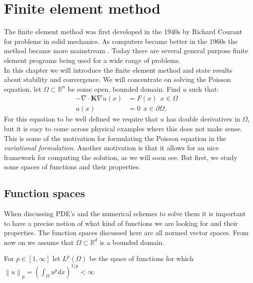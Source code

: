 \documentclass[../Main/main.tex]{subfiles}
\begin{document}
	\graphicspath{{../Finite element method/figs/}}
	\chapter{Finite element method}
	The finite element method was first developed in the 1940s by Richard Courant for problems in solid mechanics. As computers became better in the 1960s the method became  more mainstream \cite{Stein2014}. Today there are several general purpose finite element programs being used for a wide range of problems.\\
	In this chapter we will introduce the finite element method and state results about stability and convergence.
	We will concentrate on solving the Poisson equation, let $\Omega \subset \mathbb{R}^n$ be some open, bounded domain. Find $u$ such that:
	\begin{equation} \label{eq:poisson}
		\begin{split}
			-\nabla \cdot \pmb{K} \nabla u(x) &= F(x) \ \  x\in \Omega \\ 
			u(x) &= 0 \ \ x\in \partial \Omega.
		\end{split}
	\end{equation}
	For this equation to be well defined we require that $u$ has double derivatives in $\Omega$, but it is easy to come across physical examples where this does not make sense.
	This is some of the motivation for formulating the Poisson equation in the \emph{variational formulation}. Another motivation is that it allows for an nice framework for computing the solution, as we will soon see. But first, we study some spaces of functions and their properties.
	
	
	\section*{Function spaces}
	When discussing PDE's and the numerical schemes to solve them it is important to have a precise notion of what kind of functions we are looking for and their properties. The function spaces discussed here are all normed vector spaces. From now on we assume that $\Omega \subset \mathbb{R}^d$ is a bounded domain.
	\begin{definition}
		For $p\in [1,\infty]$ let $L^p(\Omega)$ be the space of functions for which  $\left \| u \right \|_p = (\int_{\Omega} u^pdx)^{1/p} <\infty$
	\end{definition}
\end{document}
